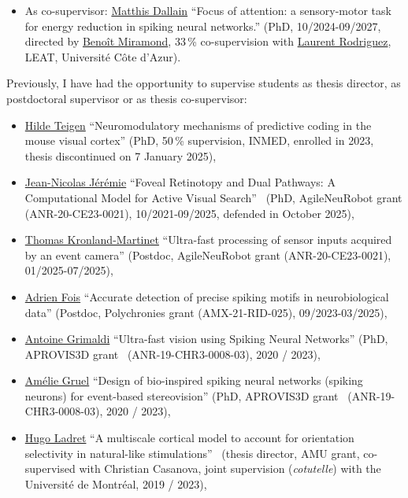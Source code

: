 \documentclass[10pt,english,a4paper,oneside]{article}%
\begin{document}
\begin{itemize}
	\item As co-supervisor: \href{https://laurentperrinet.github.io/author/matthis-dallain/}{Matthis Dallain} ``Focus of attention: a sensory-motor task for energy reduction in spiking neural networks.'' (PhD, 10/2024-09/2027, directed by \href{https://laurentperrinet.github.io/author/beno%C3%AEt-miramond/}{Benoît Miramond}, 33\,\% co-supervision with \href{https://laurentperrinet.github.io/author/laurent-rodriguez/}{Laurent Rodriguez}, LEAT, Université Côte d'Azur).
\end{itemize}


Previously, I have had the opportunity to supervise students as thesis director, as postdoctoral supervisor or as thesis co-supervisor:
\begin{itemize}
	\item \href{https://laurentperrinet.github.io/author/hilde-langengen-teigen/}{Hilde Teigen} ``Neuromodulatory mechanisms of predictive coding in the mouse visual cortex'' (PhD, 50\,\% supervision, INMED, enrolled in 2023, thesis discontinued on 7 January 2025),
	\item \href{https://laurentperrinet.github.io/author/jean-nicolas-jeremie/}{Jean-Nicolas Jérémie} ``Foveal Retinotopy and Dual Pathways: A Computational Model for Active Visual Search''~\textcite{Jeremie25thesis} (PhD, AgileNeuRobot grant (ANR-20-CE23-0021), 10/2021-09/2025, defended in October 2025),
	\item \href{https://laurentperrinet.github.io/author/thomas-kronland-martinet/}{Thomas Kronland-Martinet} ``Ultra-fast processing of sensor inputs acquired by an event camera'' (Postdoc, AgileNeuRobot grant (ANR-20-CE23-0021), 01/2025-07/2025),
	\item \href{https://laurentperrinet.github.io/author/adrien-fois/}{Adrien Fois} ``Accurate detection of precise spiking motifs in neurobiological data'' (Postdoc, Polychronies grant (AMX-21-RID-025), 09/2023-03/2025),
	\item \href{https://laurentperrinet.github.io/author/antoine-grimaldi/}{Antoine Grimaldi} ``Ultra-fast vision using Spiking Neural Networks'' (PhD, APROVIS3D grant~\textcite{Grimaldi24thesis} (ANR-19-CHR3-0008-03), 2020 / 2023),
	\item \href{https://laurentperrinet.github.io/author/amélie-gruel/}{Amélie Gruel} ``Design of bio-inspired spiking neural networks (spiking neurons) for event-based stereovision'' (PhD, APROVIS3D grant~\textcite{Gruel23thesis} (ANR-19-CHR3-0008-03), 2020 / 2023),
	\item \href{https://laurentperrinet.github.io/author/hugo-ladret/}{Hugo Ladret} ``A multiscale cortical model to account for orientation selectivity in natural-like stimulations''~\textcite{Ladret24thesis}  (thesis director, AMU grant, co-supervised with Christian Casanova, joint supervision (\emph{cotutelle}) with the Université de Montréal, 2019 / 2023),

\end{itemize}
\end{document}
